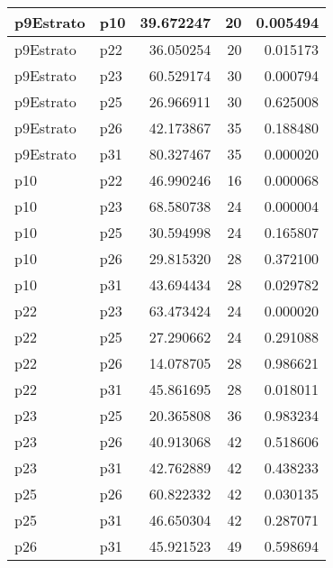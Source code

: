 \begin{table}
\begin{tabular}[t]{l|l|r|r|r}
\hline
p9Estrato & p10 & 39.672247 & 20 & 0.005494\\
\hline
p9Estrato & p22 & 36.050254 & 20 & 0.015173\\
\hline
p9Estrato & p23 & 60.529174 & 30 & 0.000794\\
\hline
p9Estrato & p25 & 26.966911 & 30 & 0.625008\\
\hline
p9Estrato & p26 & 42.173867 & 35 & 0.188480\\
\hline
p9Estrato & p31 & 80.327467 & 35 & 0.000020\\
\hline
p10 & p22 & 46.990246 & 16 & 0.000068\\
\hline
p10 & p23 & 68.580738 & 24 & 0.000004\\
\hline
p10 & p25 & 30.594998 & 24 & 0.165807\\
\hline
p10 & p26 & 29.815320 & 28 & 0.372100\\
\hline
p10 & p31 & 43.694434 & 28 & 0.029782\\
\hline
p22 & p23 & 63.473424 & 24 & 0.000020\\
\hline
p22 & p25 & 27.290662 & 24 & 0.291088\\
\hline
p22 & p26 & 14.078705 & 28 & 0.986621\\
\hline
p22 & p31 & 45.861695 & 28 & 0.018011\\
\hline
p23 & p25 & 20.365808 & 36 & 0.983234\\
\hline
p23 & p26 & 40.913068 & 42 & 0.518606\\
\hline
p23 & p31 & 42.762889 & 42 & 0.438233\\
\hline
p25 & p26 & 60.822332 & 42 & 0.030135\\
\hline
p25 & p31 & 46.650304 & 42 & 0.287071\\
\hline
p26 & p31 & 45.921523 & 49 & 0.598694\\
\hline
\end{tabular}
\end{table}
